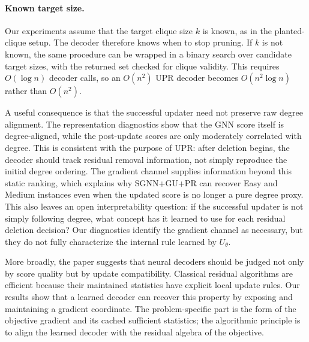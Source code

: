 \documentclass[11pt]{article}
\theoremstyle{plain}
\theoremstyle{remark}
\begin{document}
\paragraph{Known target size.}
Our experiments assume that the target clique size $k$ is known, as in the
planted-clique setup. The decoder therefore knows when to stop pruning. If $k$ is
not known, the same procedure can be wrapped in a binary search over candidate
target sizes, with the returned set checked for clique validity. This requires
$O(\log n)$ decoder calls, so an $O(n^2)$ UPR decoder becomes
$O(n^2\log n)$ rather than $O(n^2)$.

A useful consequence is that the successful updater need not preserve raw degree
alignment. The representation diagnostics show that the GNN score itself is
degree-aligned, while the post-update scores are only moderately correlated with
degree. This is consistent with the purpose of UPR: after deletion begins, the
decoder should track residual removal information, not simply reproduce the
initial degree ordering. The gradient channel supplies information beyond this
static ranking, which explains why SGNN+GU+PR can recover Easy and Medium
instances even when the updated score is no longer a pure degree proxy. This also
leaves an open interpretability question: if the successful updater is not simply
following degree, what concept has it learned to use for each residual deletion
decision? Our diagnostics identify the gradient channel as necessary, but they do
not fully characterize the internal rule learned by $U_\theta$.

More broadly, the paper suggests that neural decoders should be judged not only
by score quality but by update compatibility. Classical residual algorithms are
efficient because their maintained statistics have explicit local update rules.
Our results show that a learned decoder can recover this property by exposing
and maintaining a gradient coordinate. The problem-specific part is the form of
the objective gradient and its cached sufficient statistics; the algorithmic
principle is to align the learned decoder with the residual algebra of the
objective.
\end{document}
